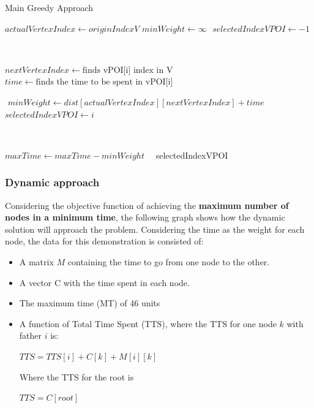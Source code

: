 \documentclass{article}
\begin{document}
    \begin{algorithm}[h]
    \caption{Main Greedy Approach}


    \begin{algorithmic}[1]
        \State $actualVertexIndex \gets originIndexV $
        \State $minWeight \gets \infty$
        \State $ $
        \State $selectedIndexVPOI \gets -1$
  
        
        \State $ $
        
            \State $nextVertexIndex \gets \text{finds vPOI[i] index in V}$ 
            \State $time \gets \text{finds the time to be spent in vPOI[i]}$
            
            \State $ $
            \State $minWeight \gets dist[actualVertexIndex][nextVertexIndex] + time$
            \State $selectedIndexVPOI \gets i$
            \EndIf
            
        \EndFor
            \State $ $

        \State $maxTime \gets maxTime - minWeight$
            \State $ $
              
            \EndIf
            \State $ $
            \State $ $
            \Return selectedIndexVPOI
    \EndProcedure
    \end{algorithmic}
\end{algorithm}


\newpage

\subsubsection*{Dynamic approach}
Considering the objective function of achieving the \textbf{maximum number of nodes in a minimum time}, the following graph shows how the dynamic solution will approach the problem. 
\newline 
Considering the time as the weight for each node, the data for this demonstration is consisted of: 
\begin{itemize}
    \item A matrix $M$ containing the time to go from one node to the other. 
    \item A vector C with the time spent in each node.
    \item The maximum time (MT) of 46 units 
    \item A function of Total Time Spent (TTS), where the TTS for one node $k$ with father $i$ is: \newline \begin{center} $TTS = TTS[i] + C[k] + M[i][k]$ \end{center}
    Where the TTS for the root is \newline \begin{center}$TTS = C[root]$\end{center}
\end{itemize}
\end{document}
